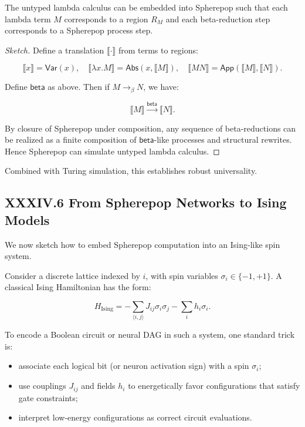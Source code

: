 \documentclass[11pt,letterpaper]{article}
\begin{document}
\begin{theorem}
The untyped lambda calculus can be embedded into Spherepop such that each lambda term $M$ corresponds to a region $R_M$ and each beta-reduction step corresponds to a Spherepop process step.
\end{theorem}

\begin{proof}[Sketch]
Define a translation $\llbracket \cdot \rrbracket$ from terms to regions:

\[
\llbracket x \rrbracket = \mathsf{Var}(x), \quad
\llbracket \lambda x. M \rrbracket = \mathsf{Abs}(x, \llbracket M \rrbracket), \quad
\llbracket M N \rrbracket = \mathsf{App}(\llbracket M \rrbracket, \llbracket N \rrbracket).
\]

Define $\mathsf{beta}$ as above. Then if $M \to_\beta N$, we have:

\[
\llbracket M \rrbracket \xrightarrow{\mathsf{beta}} \llbracket N \rrbracket.
\]

By closure of Spherepop under composition, any sequence of beta-reductions can be realized as a finite composition of $\mathsf{beta}$-like processes and structural rewrites. Hence Spherepop can simulate untyped lambda calculus.
\end{proof}

Combined with Turing simulation, this establishes robust universality.

\subsection{XXXIV.6 From Spherepop Networks to Ising Models}

We now sketch how to embed Spherepop computation into an Ising-like spin system.

Consider a discrete lattice indexed by $i$, with spin variables $\sigma_i \in \{-1,+1\}$. A classical Ising Hamiltonian has the form:

\[
H_{\text{Ising}} = -\sum_{\langle i,j\rangle} J_{ij} \sigma_i \sigma_j - \sum_i h_i \sigma_i.
\]

To encode a Boolean circuit or neural DAG in such a system, one standard trick is:

\begin{itemize}
  \item associate each logical bit (or neuron activation sign) with a spin $\sigma_i$;
  \item use couplings $J_{ij}$ and fields $h_i$ to energetically favor configurations that satisfy gate constraints;
  \item interpret low-energy configurations as correct circuit evaluations.
\end{itemize}
\end{document}
